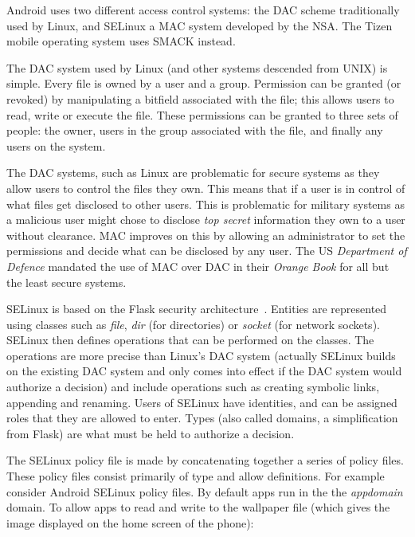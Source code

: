 \documentclass[a4paper,sfsidenotes]{%
  article%
}
\begin{document}
Android uses two different access control systems: the
\ac{DAC} scheme traditionally used by Linux, and SELinux a \ac{MAC} system
developed by the NSA.  The Tizen mobile
operating system uses SMACK instead.

The \ac{DAC} system used by Linux (and other systems descended from UNIX) is
simple.  Every file is owned by a user and a group.  Permission can be granted
(or revoked) by manipulating a bitfield associated with the file; this allows
users to read, write or execute the file.  These permissions can be granted to
three sets of people: the owner, users in the group associated with the file,
and finally any users on the system.

The \ac{DAC} systems, such as Linux are problematic for secure systems as they
allow users to control the files they own.  This means that if a user is in
control of what files get disclosed to other users.  This is problematic for
military systems as a malicious user might chose to disclose \emph{top secret}
information they own to a user without clearance.  \ac{MAC} improves on this by
allowing an administrator to set the permissions and decide what can be
disclosed by any user.  The US \emph{Department of Defence} mandated the use of
\ac{MAC} over \ac{DAC} in their \emph{Orange Book}\cite{LiliQiu:1985wq} for all but
the least secure systems.

SELinux is based on the Flask security architecture~\cite{Spencer:1999vm}.
Entities are represented using classes such as \emph{file}, \emph{dir} (for
directories) or \emph{socket} (for network sockets).  SELinux then defines
operations that can be performed on the classes.  The operations are more
precise than Linux's \ac{DAC} system (actually SELinux builds on the existing
\ac{DAC} system and only comes into effect if the \ac{DAC} system would
authorize a decision) and include operations such as creating symbolic links,
appending and renaming.  Users of SELinux have identities, and can be assigned
roles that they are allowed to enter.  Types (also called domains, a
simplification from Flask) are what must be held to authorize a decision.  

The SELinux policy file is made by concatenating together a series of policy
files.  These policy files consist primarily of type and allow definitions.
For example consider Android SELinux policy files.  By default apps run in the
the \emph{appdomain} domain.  To allow apps to read and write to the wallpaper
file (which gives the image displayed on the home screen of the phone):
\end{document}
